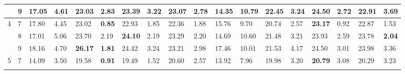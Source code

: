 \documentclass[conference]{IEEEtran}
\begin{document}
\begin{table}[]
\begin{tabular}{|cl|ll|ll|ll|ll|ll|ll|ll|ll|}
		\multicolumn{1}{|c|}{}                    & 9          & \multicolumn{1}{l|}{17.05}         & 4.61          & \multicolumn{1}{l|}{23.03}          & 2.83          & \multicolumn{1}{l|}{23.39}          & 3.22          & \multicolumn{1}{l|}{23.07}          & 2.78          & \multicolumn{1}{l|}{14.35}                & 10.79 & \multicolumn{1}{l|}{22.45} & 3.24 & \multicolumn{1}{l|}{\textbf{24.50}} & \textbf{2.72} & \multicolumn{1}{l|}{22.91}          & 3.69          \\ \hline
		\multicolumn{1}{|c|}{\multirow{3}{*}{4}}  & 7          & \multicolumn{1}{l|}{17.80}         & 4.45          & \multicolumn{1}{l|}{23.02}          & \textbf{0.85} & \multicolumn{1}{l|}{22.93}          & 1.85          & \multicolumn{1}{l|}{22.36}          & 1.88          & \multicolumn{1}{l|}{15.76}                & 9.70  & \multicolumn{1}{l|}{20.74} & 2.57 & \multicolumn{1}{l|}{\textbf{23.17}} & 0.92          & \multicolumn{1}{l|}{22.87}          & 1.53          \\ \cline{2-18} 
		\multicolumn{1}{|c|}{}                    & 8          & \multicolumn{1}{l|}{17.01}         & 5.06          & \multicolumn{1}{l|}{23.70}          & 2.19          & \multicolumn{1}{l|}{\textbf{24.10}} & 2.19          & \multicolumn{1}{l|}{23.29}          & 2.20          & \multicolumn{1}{l|}{14.69}                & 10.60 & \multicolumn{1}{l|}{21.48} & 3.21 & \multicolumn{1}{l|}{23.93}          & 2.59          & \multicolumn{1}{l|}{23.78}          & \textbf{2.04} \\ \cline{2-18} 
		\multicolumn{1}{|c|}{}                    & 9          & \multicolumn{1}{l|}{18.16}         & 4.70          & \multicolumn{1}{l|}{\textbf{26.17}} & \textbf{1.81} & \multicolumn{1}{l|}{24.42}          & 3.24          & \multicolumn{1}{l|}{23.21}          & 2.98          & \multicolumn{1}{l|}{17.46}                & 10.01 & \multicolumn{1}{l|}{21.53} & 4.17 & \multicolumn{1}{l|}{24.50}          & 3.01          & \multicolumn{1}{l|}{23.98}          & 3.36          \\ \hline
		\multicolumn{1}{|c|}{\multirow{3}{*}{5}}  & 7          & \multicolumn{1}{l|}{14.09}         & 3.50          & \multicolumn{1}{l|}{19.58}          & \textbf{0.91} & \multicolumn{1}{l|}{19.49}          & 1.52          & \multicolumn{1}{l|}{20.60}          & 2.57          & \multicolumn{1}{l|}{13.92}                & 7.96  & \multicolumn{1}{l|}{19.98} & 3.20 & \multicolumn{1}{l|}{\textbf{20.79}} & 3.08          & \multicolumn{1}{l|}{20.29}          & 3.23          \\ \cline{2-18} 

\end{tabular}
\end{table}
\end{document}
